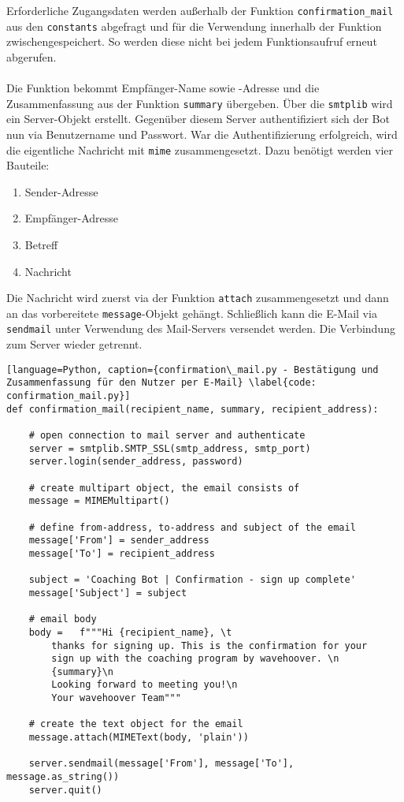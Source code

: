             Erforderliche Zugangsdaten werden außerhalb der Funktion \verb|confirmation_mail| aus den \verb|constants| abgefragt und für die Verwendung innerhalb der Funktion zwischengespeichert. So werden diese nicht bei jedem Funktionsaufruf erneut abgerufen.\\
            \\
            Die Funktion bekommt Empfänger-Name sowie -Adresse und die Zusammenfassung aus der Funktion \verb|summary| übergeben. Über die \verb|smtplib| wird ein Server-Objekt erstellt. Gegenüber diesem Server authentifiziert sich der Bot nun via Benutzername und Passwort. War die Authentifizierung erfolgreich, wird die eigentliche Nachricht mit \verb|mime| zusammengesetzt. Dazu benötigt werden vier Bauteile: 
            \begin{enumerate}
                \item Sender-Adresse
                \item Empfänger-Adresse
                \item Betreff
                \item Nachricht
            \end{enumerate}
            Die Nachricht wird zuerst via der Funktion \verb|attach| zusammengesetzt und dann an das vorbereitete \verb|message|-Objekt gehängt. Schließlich kann die E-Mail via \verb|sendmail| unter Verwendung des Mail-Servers versendet werden. Die Verbindung zum Server wieder getrennt.

            \begin{lstlisting}[language=Python, caption={confirmation\_mail.py - Bestätigung und Zusammenfassung für den Nutzer per E-Mail} \label{code: confirmation_mail.py}]
def confirmation_mail(recipient_name, summary, recipient_address):

    # open connection to mail server and authenticate
    server = smtplib.SMTP_SSL(smtp_address, smtp_port)
    server.login(sender_address, password)

    # create multipart object, the email consists of
    message = MIMEMultipart()

    # define from-address, to-address and subject of the email
    message['From'] = sender_address
    message['To'] = recipient_address

    subject = 'Coaching Bot | Confirmation - sign up complete'
    message['Subject'] = subject

    # email body
    body =   f"""Hi {recipient_name}, \t
        thanks for signing up. This is the confirmation for your 
        sign up with the coaching program by wavehoover. \n 
        {summary}\n
        Looking forward to meeting you!\n
        Your wavehoover Team"""
    
    # create the text object for the email
    message.attach(MIMEText(body, 'plain'))

    server.sendmail(message['From'], message['To'], message.as_string())
    server.quit()
            \end{lstlisting}


